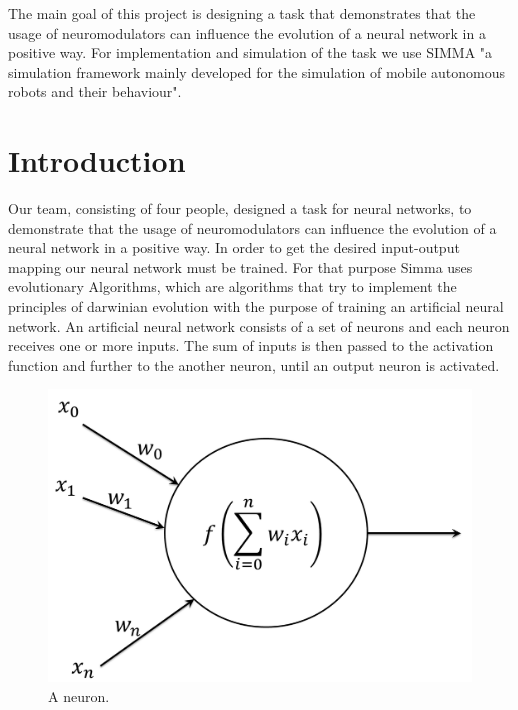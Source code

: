 \documentclass[12pt,fleqn,a4paper]{article}
\begin{document}
\clearpage
\pagestyle{headings}
\setcounter{page}{1}
\setcounter{page}{1}

\tableofcontents
\newpage

\abstract
{The main goal of this project is designing a task that demonstrates that the usage of neuromodulators can influence the evolution of a neural network in a positive way. For implementation and simulation of the task we use SIMMA "a simulation framework mainly developed for the simulation of mobile autonomous robots and their behaviour".}

\section{Introduction}
Our team, consisting of four people, designed a task for neural networks, to demonstrate that the usage of neuromodulators can influence the evolution of a neural network in a positive way.
In order to get the desired input-output mapping our neural network must be trained.
For that purpose Simma uses evolutionary Algorithms, which are algorithms that try to implement the principles of darwinian evolution with the purpose of training an artificial neural network. An artificial neural network consists of a set of neurons and each neuron receives one or more inputs. The sum of inputs is then passed to the activation function and further to the another neuron, until an output neuron is activated.

\begin{figure}[h]
\centering
\includegraphics[scale=0.3]{img/neuron.png}
\caption{A neuron.}
\label{fig:neuron}
\end{figure}
\end{document}
